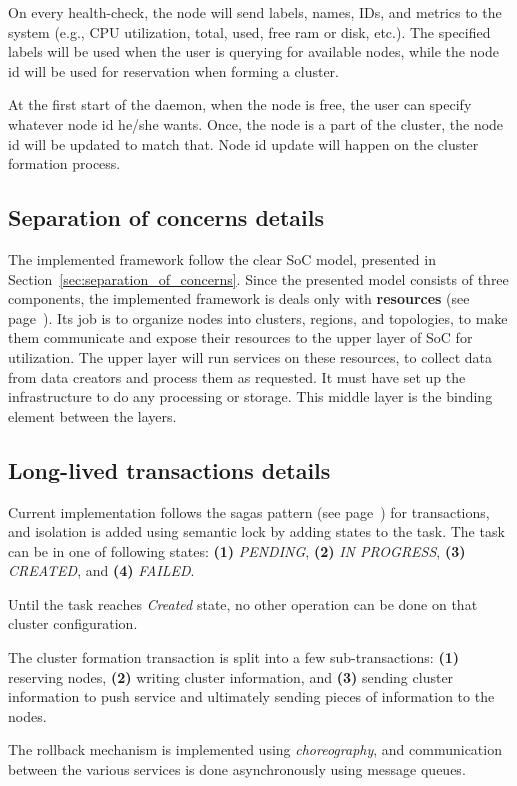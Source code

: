 On every health-check, the node will send labels, names, IDs, and metrics to the system (e.g., CPU utilization, total, used, free ram or disk, etc.). The specified labels will be used when the user is querying for available nodes, while the node id will be used for reservation when forming a cluster.

At the first start of the daemon, when the node is free, the user can specify whatever node id he/she wants. Once, the node is a part of the cluster, the node id will be updated to match that. Node id update will happen on the cluster formation process.
%
%
\subsection{Separation of concerns details}\label{sec:framework_SoC}
%
The implemented framework follow the clear SoC model, presented in Section~\ref{sec:separation_of_concerns}. Since the presented model consists of three components, the implemented framework is deals only with \textbf{resources} (see page~\pageref{soc:resources}). Its job is to organize nodes into clusters, regions, and topologies, to make them communicate and expose their resources to the upper layer of SoC for utilization. The upper layer will run services on these resources, to collect data from data creators and process them as requested. It must have set up the infrastructure to do any processing or storage. This middle layer is the binding element between the layers.
%
%
\subsection{Long-lived transactions details}\label{sec:transaction}
%
Current implementation follows the sagas pattern (see page~\pageref{sec:sagas}) for transactions, and isolation is added using semantic lock by adding states to the task. The task can be in one of following states: \textbf{(1)} \emph{PENDING}, \textbf{(2)} \emph{IN PROGRESS}, \textbf{(3)} \emph{CREATED}, and \textbf{(4)} \emph{FAILED}. 

Until the task reaches \emph{Created} state, no other operation can be done on that cluster configuration.

The cluster formation transaction is split into a few sub-transactions: \textbf{(1)} reserving nodes, \textbf{(2)} writing cluster information, and \textbf{(3)} sending cluster information to push service and ultimately sending pieces of information to the nodes. 

The rollback mechanism is implemented using \emph{choreography}, and communication between the various services is done asynchronously using message queues.
%
%
